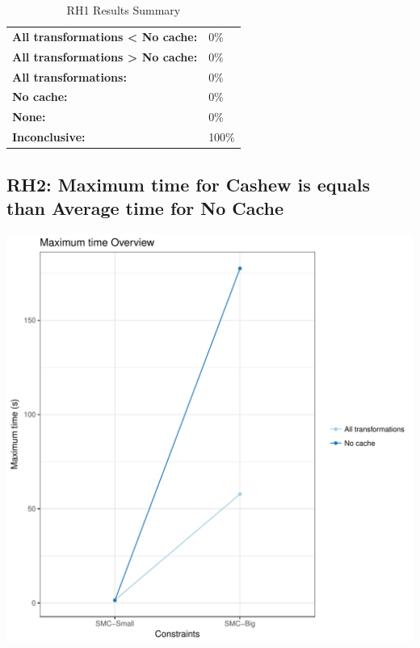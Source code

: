 \documentclass{article}\usepackage[]{graphicx}\usepackage[]{color}
\makeatletter
\def\maxwidth{ %
  \ifdim\Gin@nat@width>\linewidth
    \linewidth
  \else
    \Gin@nat@width
  \fi
}
\newenvironment{knitrout}{}{} %
\makeatother
\begin{document}
	\begin{table}[H]
	\centering
	\caption{RH1 Results Summary}
	\begin{tabular}{ll}
	\textbf{All transformations \textless{} No cache:}& 0\% \\
	\textbf{All transformations \textgreater{} No cache:}& 0\%\\
	\textbf{All transformations:} & 0\%\\
	\textbf{No cache:} & 0\%\\
	\textbf{None:}& 0\%\\
	\textbf{Inconclusive:}& 100\%
			
	
	\end{tabular}
	\end{table}
	
	
	



\subsection{RH2: Maximum time for Cashew is equals than Average time for No Cache}


 
\begin{knitrout}
\color{fgcolor}
\includegraphics[width=\maxwidth]{figure/overview_RH2-1} 

\end{knitrout}
 	
\end{document}
